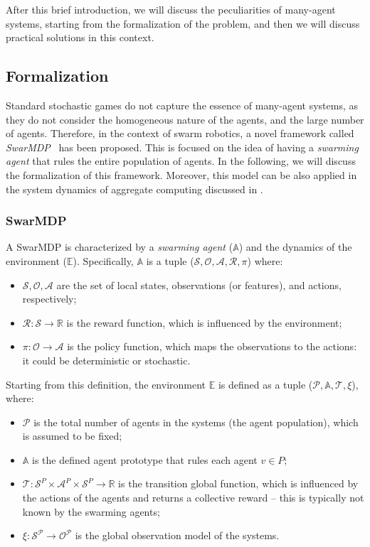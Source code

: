 After this brief introduction, 
 we will discuss the peculiarities of many-agent systems,
 starting from the formalization of the problem,
  and then we will discuss practical solutions in this context.
\subsection{Formalization}
Standard stochastic games do not capture the essence of many-agent systems, 
 as they do not consider the homogeneous nature of the agents, and the large number of agents.
Therefore, in the context of swarm robotics, 
 a novel framework called \emph{SwarMDP}~\cite{vsovsic2016inverse} has been proposed.
 This is focused on the idea of having a \emph{swarming agent} that rules the entire population of agents.
 In the following, we will discuss the formalization of this framework.
Moreover, this model can be also applied in the system dynamics of aggregate computing discussed in .
\subsubsection{SwarMDP}
A SwarMDP is characterized by a \emph{swarming agent} ($\mathbb{A}$) and the dynamics of the environment ($\mathbb{E}$).
Specifically, $\mathbb{A}$ is a tuple ($\mathcal{S}, \mathcal{O}, \mathcal{A}, \mathcal{R}, \pi$) where:
\begin{itemize}
  \item $\mathcal{S, O, A}$ are the set of local states, observations (or features), and actions, respectively;
  \item $\mathcal{R}: \mathcal{S} \rightarrow \mathbb{R}$ is the reward function, which is influenced by the environment;
  \item $\pi: \mathcal{O} \rightarrow \mathcal{A}$ is the policy function, which maps the observations to the actions: it could be deterministic or stochastic.
\end{itemize}
Starting from this definition, the environment $\mathbb{E}$ is defined as a tuple ($\mathcal{P}, \mathbb{A}, \mathcal{T}, \xi$), where:
\begin{itemize}
  \item $\mathcal{P}$ is the total number of agents in the systems (the agent population), which is assumed to be fixed;
  \item $\mathbb{A}$ is the defined agent prototype that rules each agent $v \in P$;
  \item $\mathcal{T}: \mathcal{S}^P \times \mathcal{A}^P \times \mathcal{S}^P \rightarrow \mathbb{R}$ is the transition  global function, which is influenced by the actions of the agents and returns a collective reward -- this is typically not known by the swarming agents;
  \item $\xi: \mathcal{S^P} \rightarrow \mathcal{O^P}$ is the global observation model of the systems.
\end{itemize}

